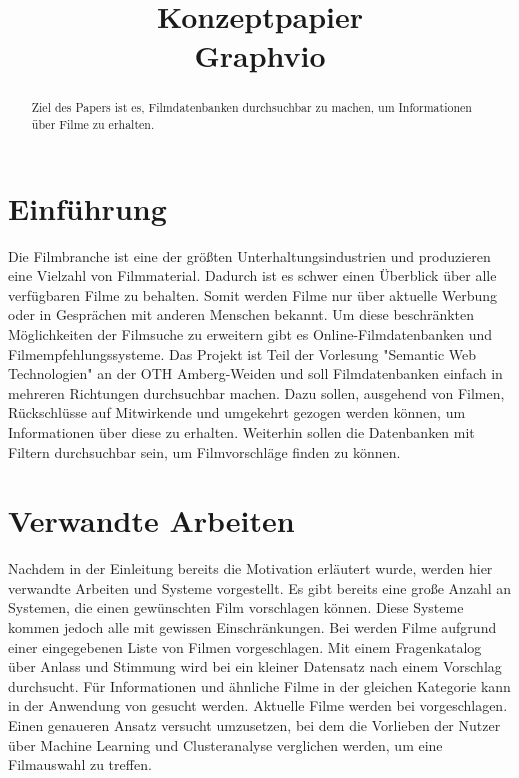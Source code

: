 \documentclass[conference]{IEEEtran}
\begin{document}
\title{Konzeptpapier\\Graphvio}

\author{
	\and

}

\maketitle

\begin{abstract}
	Ziel des Papers ist es, Filmdatenbanken durchsuchbar zu machen, um Informationen über Filme zu erhalten.
\end{abstract}


\section{Einführung}

Die Filmbranche ist eine der größten Unterhaltungsindustrien und produzieren eine Vielzahl von Filmmaterial.
Dadurch ist es schwer einen Überblick über alle verfügbaren Filme zu behalten.
Somit werden Filme nur über aktuelle Werbung oder in Gesprächen mit anderen Menschen bekannt.
Um diese beschränkten Möglichkeiten der Filmsuche zu erweitern gibt es Online-Filmdatenbanken und Filmempfehlungssysteme.
Das Projekt ist Teil der Vorlesung "Semantic Web Technologien" an der OTH Amberg-Weiden und soll Filmdatenbanken einfach in mehreren Richtungen durchsuchbar machen.
Dazu sollen, ausgehend von Filmen, Rückschlüsse auf Mitwirkende und umgekehrt gezogen werden können, um Informationen über diese zu erhalten.
Weiterhin sollen die Datenbanken mit Filtern durchsuchbar sein, um Filmvorschläge finden zu können.





\section{Verwandte Arbeiten}

Nachdem in der Einleitung bereits die Motivation erläutert wurde, werden hier verwandte Arbeiten und Systeme vorgestellt.
Es gibt bereits eine große Anzahl an Systemen, die einen gewünschten Film vorschlagen können. Diese Systeme kommen jedoch alle mit gewissen Einschränkungen.
Bei \cite{cinemate} werden Filme aufgrund einer eingegebenen Liste von Filmen vorgeschlagen.
Mit einem Fragenkatalog über Anlass und Stimmung wird bei \cite{pickamovieforme} ein kleiner Datensatz nach einem Vorschlag durchsucht.
Für Informationen und ähnliche Filme in der gleichen Kategorie kann in der Anwendung von \cite{bestsimilar} gesucht werden.
Aktuelle Filme werden bei \cite{tastedive} vorgeschlagen.
Einen genaueren Ansatz versucht \cite{MovieGEN} umzusetzen, bei dem die Vorlieben der Nutzer über Machine Learning und Clusteranalyse verglichen werden, um eine Filmauswahl zu treffen.
\end{document}
